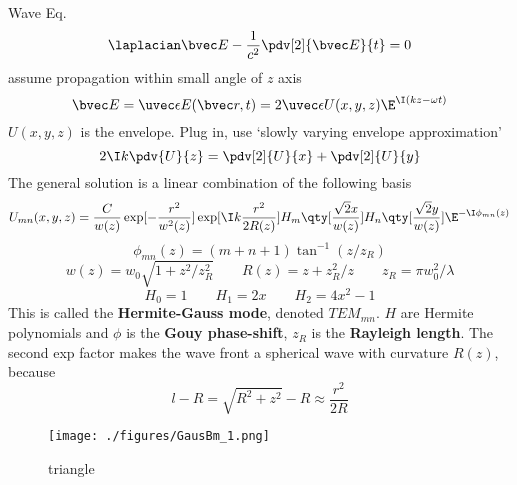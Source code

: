 
\begin{issues}
\issueDraft
\issueMissDepend
{}
\end{issues}


Wave Eq.
\begin{equation}
\laplacian \bvec E - \frac{1}{c^2} \pdv[2]{\bvec E}{t} = 0
\end{equation}
assume propagation within small angle of $z$ axis
\begin{equation}
\bvec E = \uvec \epsilon E(\bvec r, t) = 2\uvec \epsilon U(x, y, z) \E^{\I (kz - \omega t)}
\end{equation}
$U(x, y, z)$ is the envelope. Plug in, use ‘slowly varying envelope approximation’
\begin{equation}
2\I k\pdv{U}{z} = \pdv[2]{U}{x} + \pdv[2]{U}{y}
\end{equation}
The general solution is a linear combination of the following basis
\begin{equation}
U_{mn}(x, y, z) = \frac{C}{w(z)} \exp[-\frac{r^2}{w^2(z)}]\exp[\I k\frac{r^2}{2R(z)}] H_m\qty[\frac{\sqrt{2}x}{w(z)}] H_n \qty[\frac{\sqrt{2} y}{w(z)}] \E^{-\I \phi_{mn}(z)}
\end{equation}
\begin{equation}
\phi_{mn}(z) = (m+n+1)\tan^{-1}(z/z_R)
\end{equation}
\begin{equation}
w(z) = w_0\sqrt{1 + z^2/z_R^2}
\qquad
R(z) = z + z_R^2 / z
\qquad
z_R = \pi w_0^2 / \lambda
\end{equation}
\begin{equation}
H_0 = 1 \qquad H_1 = 2x \qquad H_2 = 4x^2 - 1
\end{equation}
This is called the \textbf{Hermite-Gauss mode}, denoted $TEM_{mn}$. $H$ are Hermite polynomials and $\phi$ is the \textbf{Gouy phase-shift}, $z_R$ is the \textbf{Rayleigh length}. The second exp factor makes the wave front a spherical wave with curvature $R(z)$, because
\begin{equation}
l - R = \sqrt{R^2 + z^2} - R \approx \frac{r^2}{2R}
\end{equation}

\begin{figure}[ht]
\centering
\texttt{[image: ./figures/GausBm\_1.png]}
\caption{triangle} \label{GausBm_fig1}
\end{figure}

